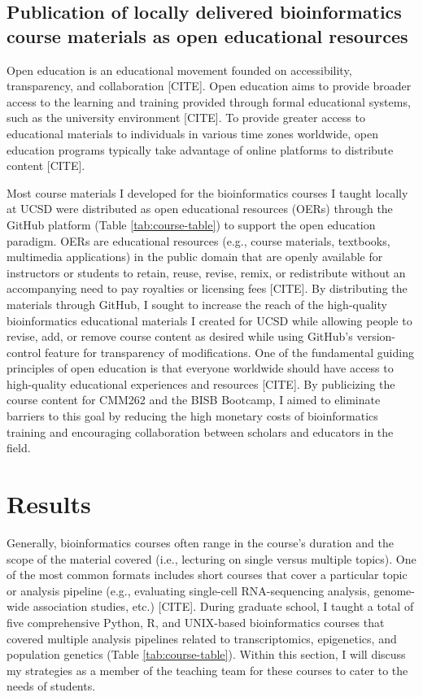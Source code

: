 \subsection{Publication of locally delivered bioinformatics course materials as open educational resources}

Open education is an educational movement founded on accessibility, transparency, and collaboration [CITE]. Open education aims to provide broader access to the learning and training provided through formal educational systems, such as the university environment [CITE]. To provide greater access to educational materials to individuals in various time zones worldwide, open education programs typically take advantage of online platforms to distribute content [CITE].  

Most course materials I developed for the bioinformatics courses I taught locally at UCSD were distributed as open educational resources (OERs) through the GitHub platform (Table \ref{tab:course-table}) to support the open education paradigm. OERs are educational resources (e.g., course materials, textbooks, multimedia applications) in the public domain that are openly available for instructors or students to retain, reuse, revise, remix, or redistribute without an accompanying need to pay royalties or licensing fees [CITE]. By distributing the materials through GitHub, I sought to increase the reach of the high-quality bioinformatics educational materials I created for UCSD while allowing people to revise, add, or remove course content as desired while using GitHub’s version-control feature for transparency of modifications. One of the fundamental guiding principles of open education is that everyone worldwide should have access to high-quality educational experiences and resources [CITE]. By publicizing the course content for CMM262 and the BISB Bootcamp, I aimed to eliminate barriers to this goal by reducing the high monetary costs of bioinformatics training and encouraging collaboration between scholars and educators in the field.

\section{Results}

Generally, bioinformatics courses often range in the course’s duration and the scope of the material covered (i.e., lecturing on single versus multiple topics). One of the most common formats includes short courses that cover a particular topic or analysis pipeline (e.g., evaluating single-cell RNA-sequencing analysis, genome-wide association studies, etc.) [CITE]. During graduate school, I taught a total of five comprehensive Python, R, and UNIX-based bioinformatics courses that covered multiple analysis pipelines related to transcriptomics, epigenetics, and population genetics (Table \ref{tab:course-table}). Within this section, I will discuss my strategies as a member of the teaching team for these courses to cater to the needs of students.

